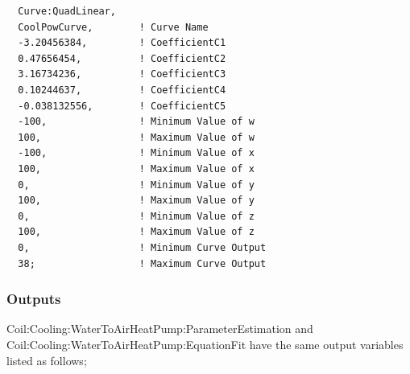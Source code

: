 \begin{lstlisting}
  Curve:QuadLinear,
  CoolPowCurve,        ! Curve Name
  -3.20456384,         ! CoefficientC1
  0.47656454,          ! CoefficientC2
  3.16734236,          ! CoefficientC3
  0.10244637,          ! CoefficientC4
  -0.038132556,        ! CoefficientC5
  -100,                ! Minimum Value of w
  100,                 ! Maximum Value of w
  -100,                ! Minimum Value of x
  100,                 ! Maximum Value of x
  0,                   ! Minimum Value of y
  100,                 ! Maximum Value of y
  0,                   ! Minimum Value of z
  100,                 ! Maximum Value of z
  0,                   ! Minimum Curve Output
  38;                  ! Maximum Curve Output
\end{lstlisting}

\subsubsection{Outputs}\label{outputs-25}

Coil:Cooling:WaterToAirHeatPump:ParameterEstimation and Coil:Cooling:WaterToAirHeatPump:EquationFit have the same output variables listed as follows;

